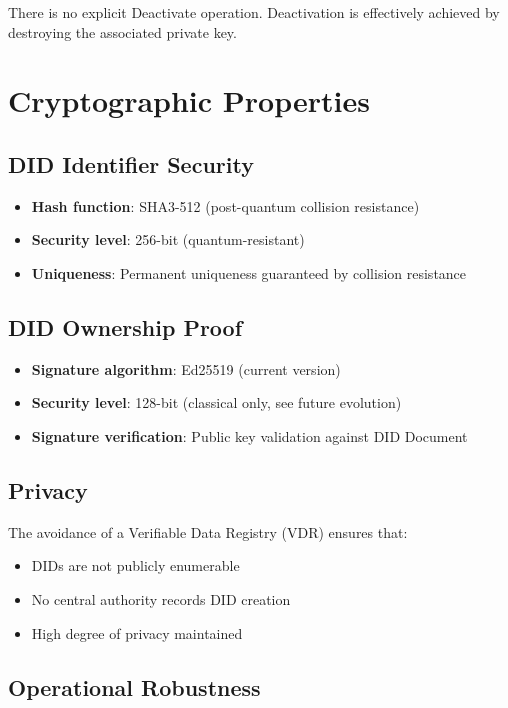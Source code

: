 There is no explicit Deactivate operation. Deactivation is effectively achieved by destroying the associated private key.

\section{Cryptographic Properties}

\subsection{DID Identifier Security}

\begin{itemize}
  \item \textbf{Hash function}: SHA3-512 (post-quantum collision resistance)
  \item \textbf{Security level}: 256-bit (quantum-resistant)
  \item \textbf{Uniqueness}: Permanent uniqueness guaranteed by collision resistance
\end{itemize}

\subsection{DID Ownership Proof}

\begin{itemize}
  \item \textbf{Signature algorithm}: Ed25519 (current version)
  \item \textbf{Security level}: 128-bit (classical only, see future evolution)
  \item \textbf{Signature verification}: Public key validation against DID Document
\end{itemize}

\subsection{Privacy}

The avoidance of a Verifiable Data Registry (VDR) ensures that:
\begin{itemize}
  \item DIDs are not publicly enumerable
  \item No central authority records DID creation
  \item High degree of privacy maintained
\end{itemize}

\subsection{Operational Robustness}

